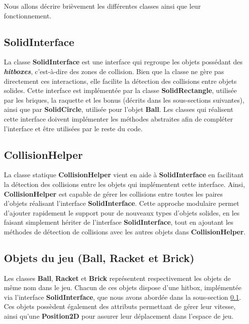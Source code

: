 \documentclass{article}
\begin{document}
\noindent Nous allons décrire brièvement les différentes classes ainsi que leur fonctionnement.

\subsection{SolidInterface}
\label{subsec:solidinterface}

\noindent La classe \textbf{SolidInterface} est une interface qui regroupe les objets possédant des \textbf{\textit{hitboxes}}, c'est-à-dire des zones de collision. Bien que la classe ne gère pas directement ces interactions, elle facilite la détection des collisions entre objets solides. Cette interface est implémentée par la classe \textbf{SolidRectangle}, utilisée par les briques, la raquette et les bonus (décrits dans les sous-sections suivantes), ainsi que par \textbf{SolidCircle}, utilisée pour l'objet \textbf{Ball}. Les classes qui réalisent cette interface doivent implémenter les méthodes abstraites afin de compléter l'interface et être utilisées par le reste du code.

\subsection{CollisionHelper}

\noindent La classe statique \textbf{CollisionHelper} vient en aide à \textbf{SolidInterface} en facilitant la détection des collisions entre les objets qui implémentent cette interface. Ainsi, \textbf{CollisionHelper} est capable de gérer les collisions entre toutes les paires d'objets réalisant l'interface \textbf{SolidInterface}. Cette approche modulaire permet d'ajouter rapidement le support pour de nouveaux types d'objets solides, en les faisant simplement hériter de l'interface \textbf{SolidInterface}, tout en ajoutant les méthodes de détection de collisions avec les autres objets dans \textbf{CollisionHelper}.

\subsection{Objets du jeu (Ball, Racket et Brick)}

\noindent Les classes \textbf{Ball}, \textbf{Racket} et \textbf{Brick} représentent respectivement les objets de même nom dans le jeu. Chacun de ces objets dispose d'une hitbox, implémentée via l'interface \textbf{SolidInterface}, que nous avons abordée dans la sous-section \ref{subsec:solidinterface}. Ces objets possèdent également des attributs permettant de gérer leur vitesse, ainsi qu'une \textbf{Position2D} pour assurer leur déplacement dans l'espace de jeu.
\end{document}
